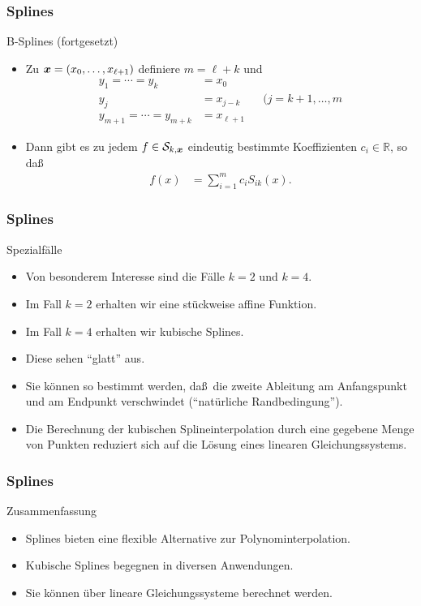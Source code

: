 \documentclass{beamer}
\def\vec#1{\mathchoice{\mbox{\boldmath$\displaystyle#1$}}
{\mbox{\boldmath$\textstyle#1$}}
{\mbox{\boldmath$\scriptstyle#1$}}
{\mbox{\boldmath$\scriptscriptstyle#1$}}}
\newcommand\cS{\mathcal S}
\newcommand\vx{\vec x}
\newcommand\RR{\mathbb R}
\renewcommand{\ae}{\"a}
\renewcommand{\oe}{\"o}
\newcommand{\ue}{\"u}
\newcommand{\mytitle}{Splines}
\begin{document}
\begin{frame}\frametitle{\mytitle}
	\begin{block}{B-Splines (fortgesetzt)}
		\begin{itemize}
			\item Zu $\vec x=(x_0,\ldots,x_{\ell+1})$ definiere $m=\ell+k$ und
				\begin{align*}
					y_1=\cdots=y_k&=x_0\\
					y_j&=x_{j-k}&&(j=k+1,\ldots,m\\
					y_{m+1}=\cdots=y_{m+k}&=x_{\ell+1}
				\end{align*}
			\item Dann gibt es zu jedem $f\in\cS_{k,\vx}$ eindeutig bestimmte Koeffizienten $c_{i}\in\RR$, so da\ss\
				\begin{align*}
					f(x)&=\sum_{i=1}^mc_iS_{ik}(x).
				\end{align*}
		\end{itemize}
	\end{block}
\end{frame}

\begin{frame}\frametitle{\mytitle}
	\begin{block}{Spezialf\ae lle}
		\begin{itemize}
			\item Von besonderem Interesse sind die F\ae lle $k=2$ und $k=4$.
			\item Im Fall $k=2$ erhalten wir eine st\ue ckweise affine Funktion.
			\item Im Fall $k=4$ erhalten wir \alert{kubische Splines}.
			\item Diese sehen ``glatt'' aus.
			\item Sie k\oe nnen so bestimmt werden, da\ss\ die zweite Ableitung am Anfangspunkt und am Endpunkt verschwindet (``nat\ue rliche Randbedingung'').
			\item Die Berechnung der kubischen Splineinterpolation durch eine gegebene Menge von Punkten reduziert sich auf die L\oe sung eines linearen Gleichungssystems.
		\end{itemize}
	\end{block}
\end{frame}

\begin{frame}\frametitle{\mytitle}
	\begin{block}{Zusammenfassung}
		\begin{itemize}
			\item Splines bieten eine flexible Alternative zur Polynominterpolation.
			\item Kubische Splines begegnen in diversen Anwendungen.
			\item Sie k\oe nnen \ue ber lineare Gleichungssysteme berechnet werden.
		\end{itemize}
	\end{block}
\end{frame}
\end{document}
